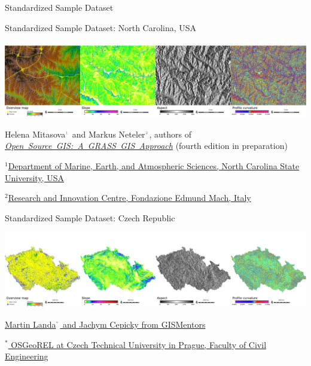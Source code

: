 \documentclass[xcolor={dvipsnames,usenames},beamer]{beamer}
\newcommand{\n}[1]{$^{\textcolor{gray}{\mbox{\tiny{#1}}}}$}
\begin{document}
\begin{frame}[fragile]{Standardized Sample Dataset}
\end{frame}



\begin{frame}{Standardized Sample Dataset: North Carolina, USA}

\begin{center}
\includegraphics[width=\textwidth]{./images/dataset/std_dataset_nc_stripe.png}
\end{center}


Helena Mitasova\n{1} and Markus Neteler\n{2}, authors of
\mbox{\href{http://grassbook.org/}{\it Open Source GIS: A GRASS GIS Approach}}
{\scriptsize (fourth edition in preparation)}

\bigskip

{\scriptsize
$^1$\href{http://www.meas.ncsu.edu/}%
{Department of Marine, Earth, and Atmospheric Sciences,
North Carolina State University, USA}

$^2$\href{http://gis.cri.fmach.it/}%
{Research and Innovation Centre, Fondazione Edmund Mach, Italy}
}

\end{frame}

\begin{frame}{Standardized Sample Dataset: Czech Republic}

\begin{center}
\includegraphics[width=\textwidth]{./images/dataset/std_dataset_cz_stripe.png}
\end{center}

\href{http://gismentors.eu/}{Martin Landa\n{*} and Jachym Cepicky from GISMentors}

\bigskip

$^*$\href{http://geomatics.fsv.cvut.cz/research/osgeorel/}%
{\scriptsize
OSGeoREL
at Czech Technical University in Prague,
Faculty of Civil Engineering
}


\note{
\begin{enumerate}
 \item 
\end{enumerate}
}

\end{frame}
\end{document}
